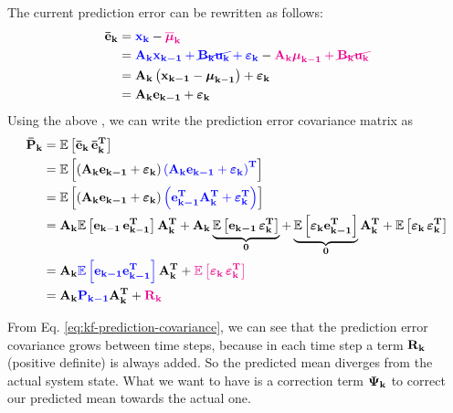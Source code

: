\documentclass[12pt]{article}
\begin{document}
The current prediction error can be rewritten as follows:
\begin{equation}
    \begin{aligned}
        \boldsymbol{\mathbf{\bar{e}_k}} &= \color{blue}\boldsymbol{\mathbf{x_k}}\color{black} - \color{magenta}{\boldsymbol{\overline{\mu}}}_\mathbf{k}\color{black} \\
        &= \color{blue}\boldsymbol{\mathbf{A_k}}\boldsymbol{\mathbf{x_{k-1}}} + \cancel{\boldsymbol{\mathbf{B_k}}\boldsymbol{\mathbf{u_k}}} + {\boldsymbol{\varepsilon}}_\mathbf{k}\color{black} - \color{magenta}\boldsymbol{\mathbf{A_k}} {\boldsymbol{\mu}}_\mathbf{k-1} + \cancel{\boldsymbol{\mathbf{B_k}}\boldsymbol{\mathbf{u_k}}} \color{black}\\
        &= \boldsymbol{\mathbf{A_k}}\left(\boldsymbol{\mathbf{x_{k-1}}} - {\boldsymbol{\mu}}_\mathbf{k-1}\right) + {\boldsymbol{\varepsilon}}_\mathbf{k} \\
        &= \boldsymbol{\mathbf{A_k}}\boldsymbol{\mathbf{e_{k-1}}} + {\boldsymbol{\varepsilon}}_\mathbf{k}
    \end{aligned}
\end{equation}
Using the above , we can write the prediction error covariance matrix as
\begin{equation}
    \begin{aligned}
        \mat{\bar{P}_k} &= \expv{\bvec{\bar{e}_k} \, \bvecT{\bar{e}_k}}\\
        &= \expv{\parentheses{\mat{A_k}\bvec{e_{k-1}} + \mb{\varepsilon}_\mathbf{k}} \blue{\parentheses{\mat{A_k}\bvec{e_{k-1}} + \mb{\varepsilon}_\mathbf{k}}^\mathbf{T}}}\\
        &= \expv{\parentheses{\mat{A_k}\bvec{e_{k-1}} + \mb{\varepsilon}_\mathbf{k}} \blue{\parentheses{\bvecT{e_{k-1}}\matT{A_k} + \mb{\varepsilon}_\mathbf{k}^\mathbf{T}}}}\\
        &= \mat{A_k}\expv{\mathbf{e_{k-1}\,e_{k-1}^T}}\matT{A_k} + \mat{A_k}\underbrace{\expv{\bvec{e_{k-1}}\,\mb{\eps}_\mathbf{k}^\mathbf{T}}}_{\mat{0}}+ \underbrace{\expv{\mb{\varepsilon}_\mathbf{k}\bvecT{e_{k-1}}}}_{\mat{0}}\matT{A_k} + \expv{\mb{\varepsilon}_\mathbf{k}\,\mb{\varepsilon}_\mathbf{k}^\mathbf{T}}\\
        &= \mat{A_k} \blue{\expv{\bvec{e_{k-1}} \bvecT{e_{k-1}}}} \matT{A_k} + \magenta{\expv{\mb{\varepsilon}_\mathbf{k}\,\mb{\varepsilon}_\mathbf{k}^\mathbf{T}}}\\
        &= \mat{A_k} \blue{\mat{P_{k-1}}} \matT{A_k} + \magenta{\mat{R_k}}
    \end{aligned}
    \label{eq:kf-prediction-covariance}
\end{equation}

From Eq. \ref{eq:kf-prediction-covariance}, we can see that the prediction error covariance grows between time steps, because in each time step a term $\boldsymbol{\mathbf{R_k}}$ (positive definite) is always added. So the predicted mean diverges from the actual system state. What we want to have is a correction term $\boldsymbol{\mathbf{\Psi_k}}$ to correct our predicted mean towards the actual one.
\end{document}
